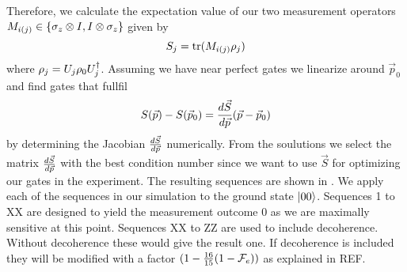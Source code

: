 Therefore, we calculate the expectation value of our two measurement operators  $M_{i(j)} \in \{ \sigma_z \otimes I, I \otimes \sigma_z \}$ given by
\begin{equation}
S_j =\mathrm{tr}{(M_{i(j)}\rho_j)}
\end{equation}
where  $\rho_j = U_j \rho_0 U_j^\dagger$. Assuming we have near perfect gates we linearize around $\vec{p}_0$ and find gates that fullfil
\begin{equation}
S(\vec{p})-S(\vec{p}_0) =\frac{d \vec{S}}{d \vec{p}}(\vec{p}-\vec{p}_0)
\end{equation}
by determining the Jacobian $\frac{d \vec{S}}{d \vec{p}}$ numerically. From the soulutions we select the matrix $\frac{d \vec{S}}{d \vec{p}}$ with the best condition number since we want to use $\vec{S}$ for optimizing our gates in the experiment.
The resulting sequences are shown in . We apply each of the sequences in our simulation to the ground state $\ket{00}$. Sequences 1 to XX are designed to yield the measurement outcome 0 as we are maximally sensitive at this point. Sequences XX to ZZ are used to include decoherence. Without decoherence these would give the result one. If decoherence is included they will be modified with a factor $(1-\frac{16}{15}(1-\mathcal{F}_e))$ as explained in REF.
  


